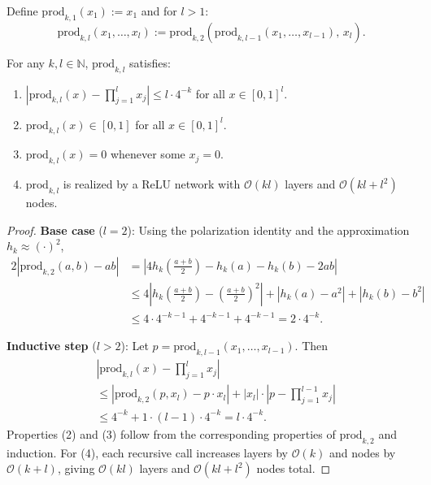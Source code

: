 \begin{definition}\label{def:approxProdL}
Define $\mathrm{prod}_{k,1}(x_1) := x_1$ and for $l > 1$:
\[
  \mathrm{prod}_{k,l}(x_1, \ldots, x_l) :=
    \mathrm{prod}_{k,2}\!\left(\mathrm{prod}_{k,l-1}(x_1, \ldots, x_{l-1}),\, x_l\right).
\]
\end{definition}

\begin{lemma}\label{lem:approxProdL}
For any $k, l \in \mathbb{N}$, $\mathrm{prod}_{k,l}$ satisfies:
\begin{enumerate}
  \item $|\mathrm{prod}_{k,l}(x) - \prod_{j=1}^l x_j| \leq l \cdot 4^{-k}$ for all $x \in [0,1]^l$.
  \item $\mathrm{prod}_{k,l}(x) \in [0,1]$ for all $x \in [0,1]^l$.
  \item $\mathrm{prod}_{k,l}(x) = 0$ whenever some $x_j = 0$.
  \item $\mathrm{prod}_{k,l}$ is realized by a ReLU network with $\mathcal{O}(kl)$ layers
    and $\mathcal{O}(kl + l^2)$ nodes.
\end{enumerate}
\end{lemma}

\begin{proof}
  \textbf{Base case} ($l = 2$): Using the polarization identity and the approximation $h_k \approx (\cdot)^2$,
  \begin{align*}
    2|\mathrm{prod}_{k,2}(a,b) - ab|
    &= \left|4h_k\!\left(\frac{a+b}{2}\right) - h_k(a) - h_k(b) - 2ab\right| \\
    &\leq 4\left|h_k\!\left(\frac{a+b}{2}\right) - \left(\frac{a+b}{2}\right)^2\right|
      + |h_k(a) - a^2| + |h_k(b) - b^2| \\
    &\leq 4 \cdot 4^{-k-1} + 4^{-k-1} + 4^{-k-1} = 2 \cdot 4^{-k}.
  \end{align*}

  \textbf{Inductive step} ($l > 2$): Let $p = \mathrm{prod}_{k,l-1}(x_1,\ldots,x_{l-1})$. Then
  \begin{align*}
    &|\mathrm{prod}_{k,l}(x) - \prod_{j=1}^l x_j| \\
    &\leq |\mathrm{prod}_{k,2}(p, x_l) - p \cdot x_l|
      + |x_l| \cdot |p - \prod_{j=1}^{l-1} x_j| \\
    &\leq 4^{-k} + 1 \cdot (l-1) \cdot 4^{-k} = l \cdot 4^{-k}.
  \end{align*}
  Properties (2) and (3) follow from the corresponding properties of $\mathrm{prod}_{k,2}$ and induction.
  For (4), each recursive call increases layers by $\mathcal{O}(k)$ and nodes by $\mathcal{O}(k + l)$,
  giving $\mathcal{O}(kl)$ layers and $\mathcal{O}(kl + l^2)$ nodes total.
\end{proof}

